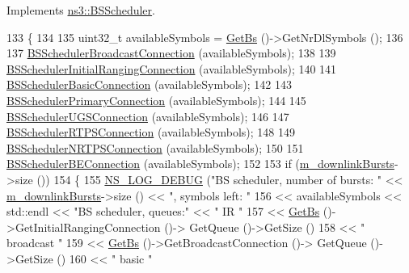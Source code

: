 Implements \hyperlink{classns3_1_1BSScheduler_aa7d20dff6d4b4f18cb328b448bb7226f}{ns3\+::\+B\+S\+Scheduler}.


\begin{DoxyCode}
133 \{
134 
135   uint32\_t availableSymbols = \hyperlink{classns3_1_1BSScheduler_a8b09065ac8f74cb35446af55128e41c7}{GetBs} ()->GetNrDlSymbols ();
136 
137   \hyperlink{classns3_1_1BSSchedulerRtps_ad041a6417c9cf0ddc40116ac877015ab}{BSSchedulerBroadcastConnection} (availableSymbols);
138 
139   \hyperlink{classns3_1_1BSSchedulerRtps_aa679d00c7063da179a3d2401e4a37f8e}{BSSchedulerInitialRangingConnection} (availableSymbols);
140 
141   \hyperlink{classns3_1_1BSSchedulerRtps_a9245c54c83bcde5e7178dacbbfc745c6}{BSSchedulerBasicConnection} (availableSymbols);
142 
143   \hyperlink{classns3_1_1BSSchedulerRtps_a2bd7697f2451b3fa6865c858e7c2556f}{BSSchedulerPrimaryConnection} (availableSymbols);
144 
145   \hyperlink{classns3_1_1BSSchedulerRtps_a71243a521e00bd88f39b681a0f14ed91}{BSSchedulerUGSConnection} (availableSymbols);
146 
147   \hyperlink{classns3_1_1BSSchedulerRtps_acb75718835482da98c9b7eafc756dc4c}{BSSchedulerRTPSConnection} (availableSymbols);
148 
149   \hyperlink{classns3_1_1BSSchedulerRtps_ae148375221d20545e3f54ac024c933c4}{BSSchedulerNRTPSConnection} (availableSymbols);
150 
151   \hyperlink{classns3_1_1BSSchedulerRtps_a74fd827556c1b6f8b58ecdb2720a36d5}{BSSchedulerBEConnection} (availableSymbols);
152 
153   \textcolor{keywordflow}{if} (\hyperlink{classns3_1_1BSSchedulerRtps_afd2e36f0462940e88519935b9df6a6ca}{m\_downlinkBursts}->size ())
154     \{
155       \hyperlink{group__logging_ga413f1886406d49f59a6a0a89b77b4d0a}{NS\_LOG\_DEBUG} (\textcolor{stringliteral}{"BS scheduler, number of bursts: "} << 
      \hyperlink{classns3_1_1BSSchedulerRtps_afd2e36f0462940e88519935b9df6a6ca}{m\_downlinkBursts}->size () << \textcolor{stringliteral}{", symbols left: "}
156                                                        << availableSymbols << std::endl << \textcolor{stringliteral}{"BS scheduler,
       queues:"} << \textcolor{stringliteral}{" IR "}
157                                                        << \hyperlink{classns3_1_1BSScheduler_a8b09065ac8f74cb35446af55128e41c7}{GetBs} ()->GetInitialRangingConnection ()->
      GetQueue ()->GetSize ()
158                                                        << \textcolor{stringliteral}{" broadcast "}
159                                                        << \hyperlink{classns3_1_1BSScheduler_a8b09065ac8f74cb35446af55128e41c7}{GetBs} ()->GetBroadcastConnection ()->
      GetQueue ()->GetSize ()
160                                                        << \textcolor{stringliteral}{" basic "}

\end{DoxyCode}

